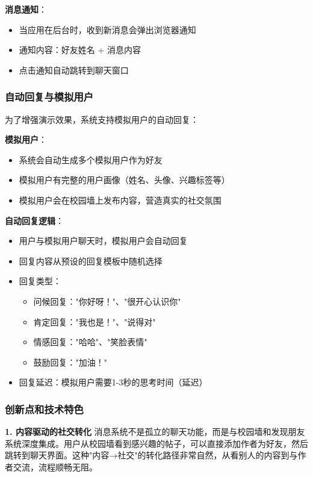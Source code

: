 \documentclass[12pt,a4paper]{article}
\begin{document}
\textbf{消息通知}：
\begin{itemize}
    \item 当应用在后台时，收到新消息会弹出浏览器通知
    \item 通知内容：好友姓名 + 消息内容
    \item 点击通知自动跳转到聊天窗口
\end{itemize}

\subsubsection{自动回复与模拟用户}

为了增强演示效果，系统支持模拟用户的自动回复：

\textbf{模拟用户}：
\begin{itemize}
    \item 系统会自动生成多个模拟用户作为好友
    \item 模拟用户有完整的用户画像（姓名、头像、兴趣标签等）
    \item 模拟用户会在校园墙上发布内容，营造真实的社交氛围
\end{itemize}

\textbf{自动回复逻辑}：
\begin{itemize}
    \item 用户与模拟用户聊天时，模拟用户会自动回复
    \item 回复内容从预设的回复模板中随机选择
    \item 回复类型：
        \begin{itemize}
            \item 问候回复："你好呀！"、"很开心认识你"
            \item 肯定回复："我也是！"、"说得对"
            \item 情感回复："哈哈"、"笑脸表情"
            \item 鼓励回复："加油！"
        \end{itemize}
    \item 回复延迟：模拟用户需要1-3秒的思考时间（延迟）
\end{itemize}

\subsubsection{创新点和技术特色}

\textbf{1. 内容驱动的社交转化}
消息系统不是孤立的聊天功能，而是与校园墙和发现朋友系统深度集成。用户从校园墙看到感兴趣的帖子，可以直接添加作者为好友，然后跳转到聊天界面。这种"内容→社交"的转化路径非常自然，从看别人的内容到与作者交流，流程顺畅无阻。
\end{document}
